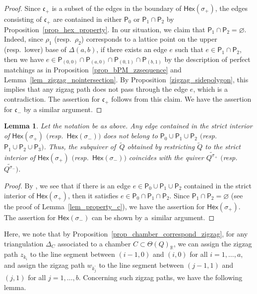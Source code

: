 \documentclass[pdftex]{sigma}
\numberwithin{equation}{section}
\newtheorem{Lemma}[Theorem]{Lemma}
\theoremstyle{definition}
\newcommand{\RR}{\mathbb{R}}
\newcommand{\fkc}{\mathfrak{c}}
\newcommand{\sfP}{\mathsf{P}}
\newcommand{\Hex}{\mathsf{Hex}}
\begin{document}
\begin{proof}
Since $\fkc_+$ is a subset of the edges in the boundary of $\Hex(\sigma_+)$, the edges consisting of $\fkc_+$ are contained in
either $\sfP_0$ or $\sfP_{1}\cap\sfP_{2}$ by Proposition~\ref{prop_hex_property}.
In our situation, we claim that $\sfP_{1}\cap\sfP_{2}=\varnothing$.
Indeed, since $\rho_1$ (resp.\ $\rho_2$) corresponds to a lattice point on the upper (resp.\ lower) base of $\Delta(a,b)$,
if there exists an edge $e$ such that $e\in\sfP_1\cap\sfP_2$,
then we have $e\in\sfP_{(0,0)}\cap\sfP_{(a,0)}\cap\sfP_{(0,1)}\cap\sfP_{(b,1)}$
by the description of perfect matchings as in Proposition~\ref{prop_bPM_zzsequence} and Lemma~\ref{lem_zigzag_nointersection}.
By Proposition~\ref{zigzag_sidepolygon}, this implies that any zigzag path does not pass through the edge $e$, which is a contradiction.
The assertion for $\fkc_+$ follows from this claim. We have the assertion for $\fkc_-$ by a similar argument.
\end{proof}

\begin{Lemma}
\label{lem_property_interior}
Let the notation be as above.
Any edge contained in the strict interior of $\Hex(\sigma_+)$ $($resp.\ $\Hex(\sigma_-))$ does not belong to $\sfP_0\cup \sfP_1\cup \sfP_2$
$($resp.\ $\sfP_1\cup \sfP_2\cup \sfP_3)$.
Thus, the subquiver of~$\widetilde{Q}$ obtained by restricting $\widetilde{Q}$ to the strict interior of $\Hex(\sigma_+)$ $($resp.\ $\Hex(\sigma_-))$
coincides with the quiver $\widetilde{Q^{\sigma_+}}$ $($resp.\ $\widetilde{Q^{\sigma_-}})$.
\end{Lemma}

\begin{proof}
By \cite[Corollary~4.18]{Moz}, we see that if there is an edge $e\in \sfP_0\cup \sfP_1\cup \sfP_2$ contained in the strict interior of $\Hex(\sigma_+)$,
then it satisfies $e\in \sfP_0\cap \sfP_1\cap \sfP_2$.
Since $\sfP_1\cap\sfP_2=\varnothing$ (see the proof of Lemma~\ref{lem_property_c}), we have the assertion for $\Hex(\sigma_+)$.
The assertion for $\Hex(\sigma_-)$ can be shown by a~similar argument.
\end{proof}

Here, we note that by Proposition~\ref{prop_chamber_correspond_zigzag},
for any triangulation $\Delta_C$ associated to a chamber $C\subset \Theta(Q)_\RR$,
we can assign the zigzag path $z_{k_i}$ to the line segment between $(i-1, 0)$ and $(i,0)$ for all $i=1, \dots, a$,
and assign the zigzag path $w_{k^\prime_j}$ to the line segment between $(j-1, 1)$ and $(j,1)$ for all $j=1, \dots, b$.
Concerning such zigzag paths, we have the following lemma.
\end{document}
